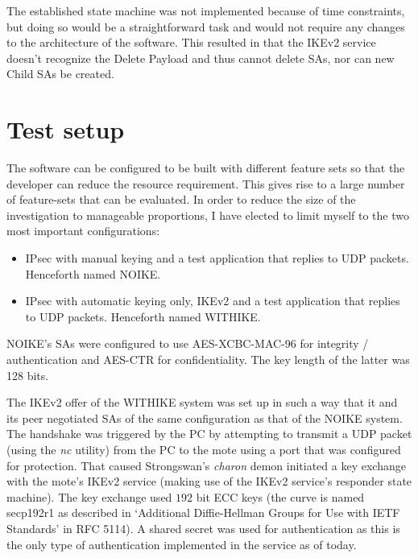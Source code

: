 \documentclass[final,a4paper,twoside,11pt,onecolumn]{report}
\begin{document}
The established state machine was not implemented because of time constraints, but doing so would be a straightforward task and would not require any changes to the architecture of the software. This resulted in that the IKEv2 service doesn't recognize the Delete Payload and thus cannot delete SAs, nor can new Child SAs be created.



\section{Test setup}
The software can be configured to be built with different feature sets so that the developer can reduce the resource requirement. This gives rise to a large number of feature-sets that can be evaluated. In order to reduce the size of the investigation to manageable proportions, I have elected to limit myself to the two most important configurations:

\begin{itemize}
   \item IPsec with manual keying and a test application that replies to UDP packets. Henceforth named NOIKE.
   \item IPsec with automatic keying only, IKEv2 and a test application that replies to UDP packets. Henceforth named WITHIKE.
\end{itemize}

NOIKE's SAs were configured to use AES-XCBC-MAC-96\cite{rfc3566} for integrity / authentication and AES-CTR\cite{rfc3686} for confidentiality. The key length of the latter was 128 bits.

The IKEv2 offer of the WITHIKE system was set up in such a way that it and its peer negotiated SAs of the same configuration as that of the NOIKE system. The handshake was triggered by the PC by attempting to transmit a UDP packet (using the \emph{nc} utility) from the PC to the mote using a port that was configured for protection. That caused Strongswan's \emph{charon} demon initiated a key exchange with the mote's IKEv2 service (making use of the IKEv2 service's responder state machine). The key exchange used $192$ bit ECC keys (the curve is named secp192r1 as described in `Additional Diffie-Hellman Groups for Use with IETF Standards' in RFC 5114\cite{rfc5114}). A shared secret was used for authentication as this is the only type of authentication implemented in the service as of today.
\end{document}
